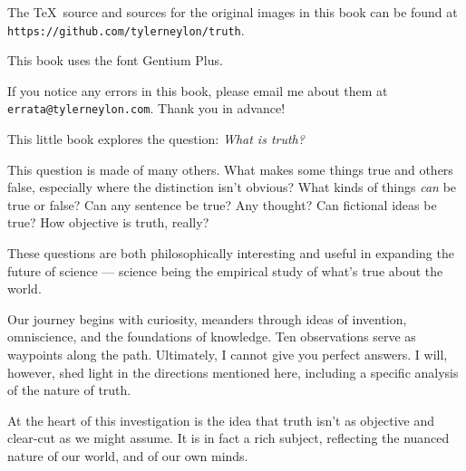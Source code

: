 \documentclass[9pt, twoside]{book}
\newcommand{\myfont}{Gentium Plus}
\theoremstyle{argtstyle}
\begin{document}
\medskip

\noindent
The \TeX\ source and sources for the original images in this book
can be found at {\tt https://github.com/tylerneylon/truth}.

\medskip

\noindent
This book uses the font \myfont.

\medskip
\noindent
If you notice any errors in this book, please email me about them
at\newline
{\tt errata@tylerneylon.com}. Thank you in advance!

\newpage

\thispagestyle{empty}
\setcounter{page}{1}

\vspace*{\fill}

\centerline{
This little book explores the question: {\em What is truth?}
}

\bigskip

This question is made of many others.
What makes some things true and
others false, especially where the distinction isn't obvious?
What kinds of things {\em can} be true or false? Can any sentence be true?
Any thought?
Can fictional ideas be true?
How objective is truth, really?

These questions are both philosophically interesting
and useful in expanding the future of science --- science being
the empirical study of what's true about the world.

Our journey begins with curiosity, meanders
through ideas of invention, omniscience, 
and the foundations of knowledge. Ten
observations serve as waypoints along the path.
Ultimately, I cannot give you perfect answers.
I will, however, shed light in the directions mentioned here,
including a specific analysis of the nature of truth.

At the heart of this investigation is the idea that
truth isn't as objective and clear-cut as we
might assume.
It is in fact a rich subject, reflecting
the nuanced nature of our world, and of our own minds.

\vspace*{\fill}
\pagebreak

\thispagestyle{empty}
\newcommand{\rowskip}{1.2cm}
\newcommand{\imgh}{1.2cm}
\newcommand{\graydots}{{\color{gray}\dotfill}}
\end{document}
